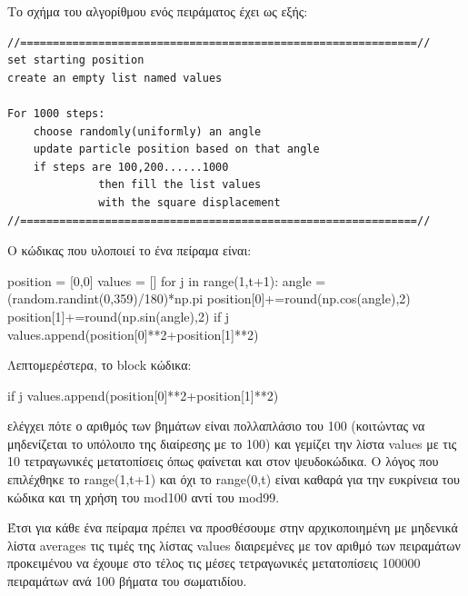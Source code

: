 Το σχήμα του αλγορίθμου ενός πειράματος έχει ως εξής: 
\en
\begin{lstlisting}
//=============================================================//
set starting position 
create an empty list named values

For 1000 steps:
    choose randomly(uniformly) an angle 
    update particle position based on that angle
    if steps are 100,200......1000 
              then fill the list values
              with the square displacement
//=============================================================//
\end{lstlisting}
\gr 
Ο κώδικας που υλοποιεί το ένα πείραμα είναι:
\en
\begin{python}
position = [0,0]
values = []
for j in range(1,t+1):
    angle = (random.randint(0,359)/180)*np.pi
    position[0]+=round(np.cos(angle),2)
    position[1]+=round(np.sin(angle),2)
    if j%
        values.append(position[0]**2+position[1]**2)
\end{python}
\gr 
Λεπτομερέστερα, το {\en block} κώδικα:
\en
\begin{python}
if j%
    values.append(position[0]**2+position[1]**2)
\end{python}
\gr ελέγχει πότε ο αριθμός των βημάτων είναι πολλαπλάσιο του 100 (κοιτώντας να μηδενίζεται το υπόλοιπο της διαίρεσης με το 100) και γεμίζει την λίστα {\en values} με τις 10 τετραγωνικές μετατοπίσεις όπως φαίνεται και στον ψευδοκώδικα. Ο λόγος που επιλέχθηκε το {\en range(1,t+1)} και όχι το {\en range(0,t)} είναι καθαρά για την ευκρίνεια του κώδικα και τη χρήση του {\en mod100} αντί του {\en mod99}.

Έτσι για κάθε ένα πείραμα πρέπει να προσθέσουμε στην αρχικοποιημένη με μηδενικά λίστα {\en averages} τις τιμές της λίστας {\en values} διαιρεμένες με τον αριθμό των πειραμάτων προκειμένου να έχουμε στο τέλος τις μέσες τετραγωνικές μετατοπίσεις 100000 πειραμάτων ανά 100 βήματα του σωματιδίου.

